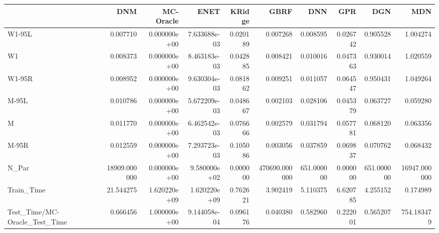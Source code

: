 \begin{tabular}{lrrrrrrrrr}
\toprule
{} &           DNM &     MC-Oracle &          ENET &    KRidge &           GBRF &         DNN &       GPR &         DGN &           MDN \\
\midrule
W1-95L                        &      0.007710 &  0.000000e+00 &  7.633688e-03 &  0.020189 &       0.007268 &    0.008595 &  0.026742 &    0.905528 &      1.004274 \\
W1                            &      0.008373 &  0.000000e+00 &  8.463183e-03 &  0.042885 &       0.008421 &    0.010016 &  0.047363 &    0.930014 &      1.020559 \\
W1-95R                        &      0.008952 &  0.000000e+00 &  9.630304e-03 &  0.081862 &       0.009251 &    0.011057 &  0.064547 &    0.950431 &      1.049264 \\
M-95L                         &      0.010786 &  0.000000e+00 &  5.672209e-03 &  0.048667 &       0.002103 &    0.028106 &  0.045379 &    0.063727 &      0.059280 \\
M                             &      0.011770 &  0.000000e+00 &  6.462542e-03 &  0.076666 &       0.002579 &    0.031794 &  0.057781 &    0.068120 &      0.063356 \\
M-95R                         &      0.012559 &  0.000000e+00 &  7.293723e-03 &  0.105086 &       0.003056 &    0.037859 &  0.069837 &    0.070762 &      0.068432 \\
N\_Par                         &  18909.000000 &  0.000000e+00 &  9.580000e+02 &  0.000000 &  470690.000000 &  651.000000 &  0.000000 &  651.000000 &  16947.000000 \\
Train\_Time                    &     21.544275 &  1.620220e+09 &  1.620220e+09 &  0.762621 &       3.902419 &    5.110375 &  6.620785 &    4.255152 &      0.174989 \\
Test\_Time/MC-Oracle\_Test\_Time &      0.666456 &  1.000000e+00 &  9.144058e-04 &  0.096176 &       0.040380 &    0.582960 &  0.222001 &    0.565207 &    754.183479 \\
\bottomrule
\end{tabular}
